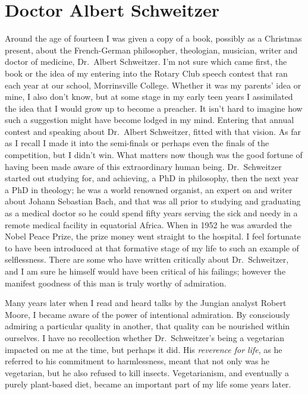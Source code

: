 \chapter{Doctor Albert Schweitzer}

Around the age of fourteen I was given a copy of a book, possibly as a
Christmas present, about the French-German philosopher, theologian,
musician, writer and doctor of medicine, Dr.~Albert Schweitzer\cite{schweitzer}.
I'm not sure which came first, the book or
the idea of my entering into the Rotary Club speech contest that ran
each year at our school, Morrinsville College. Whether it was my
parents' idea or mine, I also don't know, but at some stage in my early
teen years I assimilated the idea that I would grow up to become a
preacher. It isn't hard to imagine how such a suggestion might have
become lodged in my mind. Entering that annual contest and speaking
about Dr.~Albert Schweitzer, fitted with that vision. As far as I recall
I made it into the semi-finals or perhaps even the finals of the
competition, but I didn't win. What matters now though was the good
fortune of having been made aware of this extraordinary human being.
Dr.~Schweitzer started out studying for, and achieving, a PhD in philosophy,
then the next year a PhD in theology; he was a world renowned organist,
an expert on and writer about Johann Sebastian Bach, and that was all
prior to studying and graduating as a medical doctor so he could spend
fifty years serving the sick and needy in a remote medical facility in
equatorial Africa. When in 1952 he was awarded the Nobel Peace Prize,
the prize money went straight to the hospital. I feel fortunate to have
been introduced at that formative stage of my life to such an example of
selflessness. There are some who have written critically about
Dr.~Schweitzer, and I am sure he himself would have been critical of his
failings; however the manifest goodness of this man is truly worthy of
admiration.

Many years later when I read and heard talks by the Jungian analyst
Robert Moore, I became aware of the power of intentional admiration. By
consciously admiring a particular quality in another, that quality can
be nourished within ourselves. I have no recollection whether
Dr.~Schweitzer's being a vegetarian impacted on me at the time, but perhaps
it did. His \emph{reverence for life}, as he referred to his commitment
to harmlessness, meant that not only was he vegetarian, but he also
refused to kill insects.
Vegetarianism, and eventually a purely plant-based diet,
became an important part of my life some years later.

